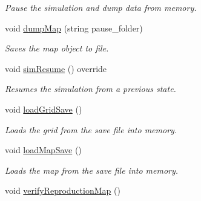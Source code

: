 \begin{DoxyCompactItemize}
\begin{DoxyCompactList}\small\item\em Pause the simulation and dump data from memory. \end{DoxyCompactList}\item 
void \hyperlink{class_spatial_tree_a51b4c8703d179cc4a4c861f8b36b4a9b}{dump\+Map} (string pause\+\_\+folder)
\begin{DoxyCompactList}\small\item\em Saves the map object to file. \end{DoxyCompactList}\item 
void \hyperlink{class_spatial_tree_ad578ceeaf0ab3f4a2e39eb907881c11f}{sim\+Resume} () override
\begin{DoxyCompactList}\small\item\em Resumes the simulation from a previous state. \end{DoxyCompactList}\item 
void \hyperlink{class_spatial_tree_a6e3cfc1c0371d90ceaa7a463470de798}{load\+Grid\+Save} ()
\begin{DoxyCompactList}\small\item\em Loads the grid from the save file into memory. \end{DoxyCompactList}\item 
void \hyperlink{class_spatial_tree_a585861bbad04528d2cabf7b1604a40dc}{load\+Map\+Save} ()
\begin{DoxyCompactList}\small\item\em Loads the map from the save file into memory. \end{DoxyCompactList}\item 
void \hyperlink{class_spatial_tree_a0eb6f50f218289c79770b203d3eeaada}{verify\+Reproduction\+Map} ()\hypertarget{class_spatial_tree_a0eb6f50f218289c79770b203d3eeaada}{}\label{class_spatial_tree_a0eb6f50f218289c79770b203d3eeaada}


\end{DoxyCompactItemize}
